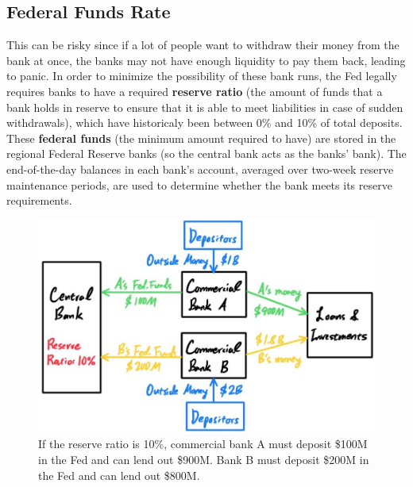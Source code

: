 \documentclass{article}
\begin{document}
  \subsection{Federal Funds Rate} 

    This can be risky since if a lot of people want to withdraw their money from the bank at once, the banks may not have enough liquidity to pay them back, leading to panic. In order to minimize the possibility of these bank runs, the Fed legally requires banks to have a required \textbf{reserve ratio} (the amount of funds that a bank holds in reserve to ensure that it is able to meet liabilities in case of sudden withdrawals), which have historicaly been between 0\% and 10\% of total deposits. These \textbf{federal funds} (the minimum amount required to have) are stored in the regional Federal Reserve banks (so the central bank acts as the banks' bank). The end-of-the-day balances in each bank's account, averaged over two-week reserve maintenance periods, are used to determine whether the bank meets its reserve requirements. 

    \begin{figure}[H]
      \centering 
      \includegraphics[scale=0.3]{img/Fed_Funds_Rate.jpg}
      \caption{If the reserve ratio is 10\%, commercial bank A must deposit \$100M in the Fed and can lend out \$900M. Bank B must deposit \$200M in the Fed and can lend out \$800M. } 
      \label{fig:Fed_Funds_Rate}
    \end{figure}
\end{document}
